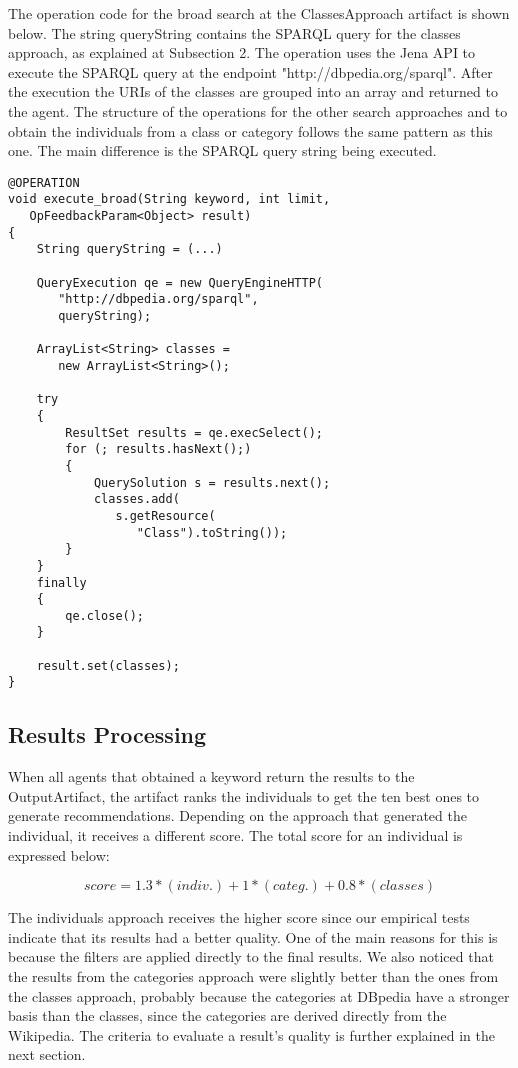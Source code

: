 \documentclass[a4paper,twoside]{article}
\begin{document}
The operation code for the broad search at the ClassesApproach artifact is shown below. The string queryString contains the SPARQL query for the classes approach, as explained at Subsection 2. The operation uses the Jena API to execute the SPARQL query at the endpoint "http://dbpedia.org/sparql". After the execution the URIs of the classes are grouped into an array and returned to the agent. The structure of the operations for the other search approaches and to obtain the individuals from a class or category follows the same pattern as this one. The main difference is the SPARQL query string being executed.

\begin{small}
\begin{verbatim}
@OPERATION
void execute_broad(String keyword, int limit,
   OpFeedbackParam<Object> result)
{
    String queryString = (...)
        
    QueryExecution qe = new QueryEngineHTTP(
       "http://dbpedia.org/sparql",
       queryString);
                
    ArrayList<String> classes =
       new ArrayList<String>();
        
    try
    {
        ResultSet results = qe.execSelect();
        for (; results.hasNext();)
        {
            QuerySolution s = results.next();
            classes.add(
               s.getResource(
                  "Class").toString());
        }
    }
    finally
    {
        qe.close();
    }
        
    result.set(classes);
}
\end{verbatim}
\end{small}

\subsection{Results Processing}

\noindent When all agents that obtained a keyword return the results to the OutputArtifact, the artifact ranks the individuals to get the ten best ones to generate recommendations. Depending on the approach that generated the individual, it receives a different score. The total score for an individual is expressed below:

\begin{equation}\label{eqX}
score = 1.3*(indiv.) + 1*(categ.) + 0.8*(classes)
\end{equation}

The individuals approach receives the higher score since our empirical tests indicate that its results had a better quality. One of the main reasons for this is because the filters are applied directly to the final results. We also noticed that the results from the categories approach were slightly better than the ones from the classes approach, probably because the categories at DBpedia have a stronger basis than the classes, since the categories are derived directly from the Wikipedia. The criteria to evaluate a result's quality is further explained in the next section.
\end{document}
